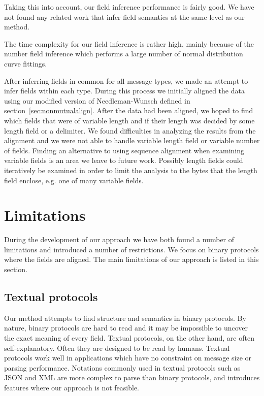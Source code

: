 \documentclass[a4paper]{report}
\begin{document}
Taking this into account, our field inference performance is fairly good.
We have not found any related work that infer field semantics at the same
level as our method.

The time complexity for our field inference is rather high, mainly because
of the number field inference which performs a large number of normal
distribution curve fittings.

After inferring fields in common for all message types, we made an
attempt to infer fields within each type. During this process we initially
aligned the data using our modified version of Needleman-Wunsch defined in
section~\ref{sec:nonmutualalign}. After the data had been aligned, we hoped to
find which fields that were of variable length and if their length was
decided by some length field or a delimiter. We found difficulties in
analyzing the results from the alignment and we were not able to handle
variable length field or variable number of fields. Finding an alternative
to using sequence alignment when examining variable fields is an area we
leave to future work. Possibly length fields could iteratively be examined
in order to limit the analysis to the bytes that the length field enclose,
e.g. one of many variable fields.

\section{Limitations}
During the development of our approach we have both found a number of
limitations and introduced a number of restrictions. We focus on binary
protocols where the fields are aligned. The main limitations of our approach
is listed in this section.

\subsection{Textual protocols}
Our method attempts to find structure and semantics in binary protocols.
By nature, binary protocols are hard to read and it may be impossible to
uncover the exact meaning of every field. Textual protocols, on the other
hand, are often self-explanatory. Often they are designed to be read by
humans. Textual protocols work well in applications which have no constraint
on message size or parsing performance. Notations commonly used in textual
protocols such as JSON and XML are more complex to parse than binary protocols,
and introduces features where our approach is not feasible.
\end{document}
